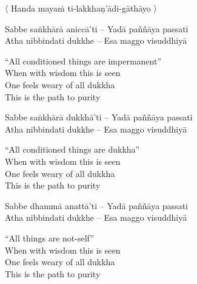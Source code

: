 \begin{leader}
  〈 Handa mayaṁ ti-lakkhaṇ'ādi-gāthāyo 〉

\end{leader}

\begin{twochants}
  Sabbe saṅkhārā aniccā'ti – Yadā paññāya passati\\
  Atha nibbindati dukkhe – Esa maggo visuddhiyā\\
\end{twochants}

\begin{english-verses}
  ``All conditioned things are impermanent''\\
  When with wisdom this is seen\\
  One feels weary of all dukkha\\
  This is the path to purity
\end{english-verses}

\begin{twochants}
  Sabbe saṅkhārā dukkhā'ti – Yadā paññāya passati\\
  Atha nibbindati dukkhe – Esa maggo visuddhiyā\\
\end{twochants}

\begin{english-verses}
  ``All conditioned things are dukkha''\\
  When with wisdom this is seen\\
  One feels weary of all dukkha\\
  This is the path to purity
\end{english-verses}

\begin{twochants}
  Sabbe dhammā anattā'ti – Yadā paññāya passati\\
  Atha nibbindati dukkhe – Esa maggo visuddhiyā\\
\end{twochants}

\begin{english-verses}
  ``All things are not-self''\\
  When with wisdom this is seen\\
  One feels weary of all dukkha\\
  This is the path to purity
\end{english-verses}

